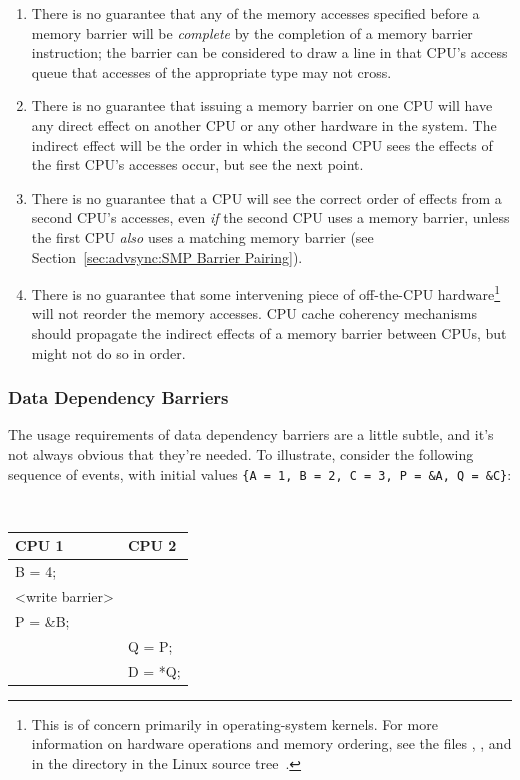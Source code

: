 \begin{enumerate}
\item	There is no guarantee that any of the memory accesses specified
	before a memory barrier will be \emph{complete} by the completion
	of a memory barrier instruction; the barrier can be considered
	to draw a line in that CPU's access queue that accesses of the
	appropriate type may not cross.
\item	There is no guarantee that issuing a memory barrier on one CPU
	will have any direct effect on another CPU or any other hardware
	in the system.	The indirect effect will be the order in which
	the second CPU sees the effects of the first CPU's accesses occur,
	but see the next point.
\item	There is no guarantee that a CPU will see the correct order
	of effects from a second CPU's accesses, even \emph{if} the second CPU
	uses a memory barrier, unless the first CPU \emph{also} uses a matching
	memory barrier (see
	Section~\ref{sec:advsync:SMP Barrier Pairing}).
\item	There is no guarantee that some intervening piece of off-the-CPU
	hardware\footnote{
		This is of concern primarily in operating-system kernels.
		For more information on hardware operations and memory
		ordering, see the files , ,
		and  in the  directory in
		the Linux source tree~\cite{Torvalds2.6kernel}.}
	will not reorder the memory accesses.  CPU cache
	coherency mechanisms should propagate the indirect effects of
	a memory barrier between CPUs, but might not do so in order.
\end{enumerate}

\subsubsection{Data Dependency Barriers}
\label{sec:advsync:Data Dependency Barriers}

The usage requirements of data dependency barriers are a little subtle, and
it's not always obvious that they're needed.  To illustrate, consider the
following sequence of events, with initial values
{\tt \{A = 1, B = 2, C = 3, P = \&A, Q = \&C\}}:

\vspace{5pt}
\begin{minipage}[t]{\columnwidth}
\tt
\scriptsize
\begin{tabular}{l|l}
	CPU 1 &		CPU 2 \\
	\hline
	B = 4; & \\
	<write barrier> & \\
	P = \&B; &	\\
		&	Q = P; \\
		&	D = *Q; \\
\end{tabular}
\end{minipage}
\vspace{5pt}

